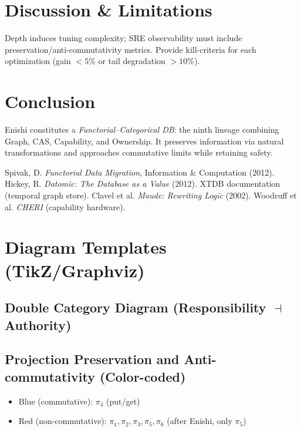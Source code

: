 \documentclass[10pt]{article}
\begin{document}
\section{Discussion \& Limitations}
Depth induces tuning complexity; SRE observability must include preservation/anti-commutativity metrics.
Provide kill-criteria for each optimization (gain $<\!5\%$ or tail degradation $>\!10\%$).

\section{Conclusion}
Enishi constitutes a \emph{Functorial--Categorical DB}: the ninth lineage combining Graph, CAS, Capability, and Ownership.
It preserves information via natural transformations and approaches commutative limits while retaining safety.

\begin{thebibliography}{9}
 Spivak, D. \emph{Functorial Data Migration}, Information \& Computation (2012).
 Hickey, R. \emph{Datomic: The Database as a Value} (2012).
 XTDB documentation (temporal graph store).
 Clavel et al. \emph{Maude: Rewriting Logic} (2002).
 Woodruff et al. \emph{CHERI} (capability hardware).
\end{thebibliography}

\appendix
\section{Diagram Templates (TikZ/Graphviz)}

\subsection{Double Category Diagram (Responsibility $\dashv$ Authority)}


\subsection{Projection Preservation and Anti-commutativity (Color-coded)}
\begin{itemize}
    \item Blue (commutative): $\pi_4$ (put/get)
    \item Red (non-commutative): $\pi_1,\pi_2,\pi_3,\pi_5,\pi_6$ (after Enishi, only $\pi_5$)
\end{itemize}
\end{document}
